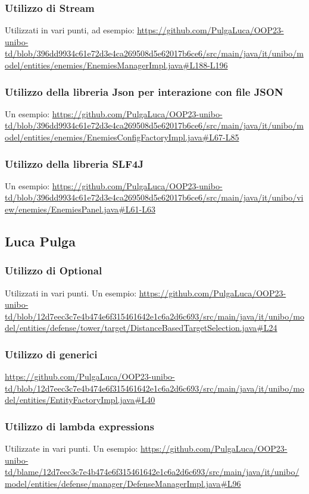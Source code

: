 \documentclass[a4paper,12pt]{report}
\begin{document}
\subsubsection{Utilizzo di Stream}
Utilizzati in vari punti, ad esempio:
\url{https://github.com/PulgaLuca/OOP23-unibo-td/blob/396dd9934c61e72d3e4ca269508d5e62017b6ce6/src/main/java/it/unibo/model/entities/enemies/EnemiesManagerImpl.java#L188-L196}

\subsubsection{Utilizzo della libreria Json per interazione con file JSON}
Un esempio: 
\url{https://github.com/PulgaLuca/OOP23-unibo-td/blob/396dd9934c61e72d3e4ca269508d5e62017b6ce6/src/main/java/it/unibo/model/entities/enemies/EnemiesConfigFactoryImpl.java#L67-L85}
\subsubsection{Utilizzo della libreria SLF4J}
Un esempio:
\url{https://github.com/PulgaLuca/OOP23-unibo-td/blob/396dd9934c61e72d3e4ca269508d5e62017b6ce6/src/main/java/it/unibo/view/enemies/EnemiesPanel.java#L61-L63}
\subsection{Luca Pulga}
\subsubsection{Utilizzo di Optional}
Utilizzati in vari punti. Un esempio: 
\url{https://github.com/PulgaLuca/OOP23-unibo-td/blob/12d7eec3c7e4b474e6f315461642e1c6a2d6c693/src/main/java/it/unibo/model/entities/defense/tower/target/DistanceBasedTargetSelection.java#L24}

\subsubsection{Utilizzo di generici}
\url{https://github.com/PulgaLuca/OOP23-unibo-td/blob/12d7eec3c7e4b474e6f315461642e1c6a2d6c693/src/main/java/it/unibo/model/entities/EntityFactoryImpl.java#L40}

\subsubsection{Utilizzo di lambda expressions}
Utilizzate in vari punti. Un esempio:  
\url{https://github.com/PulgaLuca/OOP23-unibo-td/blame/12d7eec3c7e4b474e6f315461642e1c6a2d6c693/src/main/java/it/unibo/model/entities/defense/manager/DefenseManagerImpl.java#L96}
\end{document}
